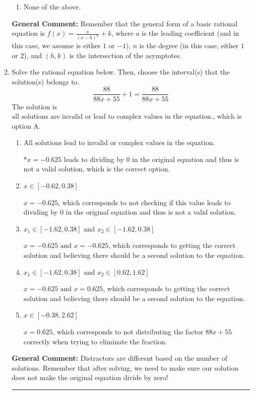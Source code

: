 \documentclass{extbook}[14pt]
\newcommand{\litem}[1]{\item #1

\rule{\textwidth}{0.4pt}}
\begin{document}
\begin{enumerate}
{\begin{enumerate}[label=\Alph*.]
\begin{multicols}{2}
\end{multicols}\item None of the above.\end{enumerate}
\textbf{General Comment:} Remember that the general form of a basic rational equation is $ f(x) = \frac{a}{(x-h)^n} + k$, where $a$ is the leading coefficient (and in this case, we assume is either $1$ or $-1$), $n$ is the degree (in this case, either $1$ or $2$), and $(h, k)$ is the intersection of the asymptotes.
}
\litem{
Solve the rational equation below. Then, choose the interval(s) that the solution(s) belongs to.
\[ \frac{88}{88x + 55} + 1 = \frac{88}{88x + 55} \]The solution is \( \text{all solutions are invalid or lead to complex values in the equation.} \), which is option A.\begin{enumerate}[label=\Alph*.]
\item \( \text{All solutions lead to invalid or complex values in the equation.} \)

*$x = -0.625$ leads to dividing by 0 in the original equation and thus is not a valid solution, which is the correct option.
\item \( x \in [-0.62,0.38] \)

$x = -0.625$, which corresponds to not checking if this value leads to dividing by 0 in the original equation and thus is not a valid solution.
\item \( x_1 \in [-1.62, 0.38] \text{ and } x_2 \in [-1.62,0.38] \)

$x = -0.625 \text{ and } x = -0.625$, which corresponds to getting the correct solution and believing there should be a second solution to the equation.
\item \( x_1 \in [-1.62, 0.38] \text{ and } x_2 \in [0.62,1.62] \)

$x = -0.625 \text{ and } x = 0.625$, which corresponds to getting the correct solution and believing there should be a second solution to the equation.
\item \( x \in [-0.38,2.62] \)

$x = 0.625$, which corresponds to not distributing the factor $88x + 55$ correctly when trying to eliminate the fraction.
\end{enumerate}

\textbf{General Comment:} Distractors are different based on the number of solutions. Remember that after solving, we need to make sure our solution does not make the original equation divide by zero!
}
\end{enumerate}
\end{document}
